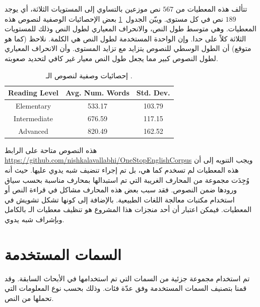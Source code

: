 تتألف هذه المعطيات من $567$ نص موزعين بالتساوي إلى المستويات الثلاثة،
أي يوجد $189$ نص في كل مستوى.
ويبّن الجدول~\ref{tbl:corpus:ose_stat} بعض الإحصائيات الوصفية لنصوص هذه المعطيات.
وهي متوسط طول النص، والانحراف المعياري لطول النص وذلك للمستويات الثلاثة كلاً على حدا.
وإن الواحدة المستخدمة لطول النص هي الكلمة.
نلاحظ (كما هو متوقع) أن الطول الوسطي للنصوص يتزايد مع تزايد المستوى.
وأن الانحراف المعياري لطول النصوص كبير مما يجعل طول النص معيار غير كافي لتحديد صعوبته.

\begin{table}[htb]
	\centering
	{
		\setlength{\tabcolsep}{0.5em} %
		\renewcommand{\arraystretch}{1.4}%
		
		\begin{tabular}{|c|c|c|}
			\hline
			
			\textbf{Reading Level} &
			\textbf{Avg. Num. Words} &
			\textbf{Std. Dev.}\\
			\hline 
			
			Elementary &
			533.17 &
			103.79 \\
			\hline
			
			Intermediate &
			676.59 &
			117.15 \\
			\hline
			
			Advanced &
			820.49 &
			162.52 \\
			\hline
			
		\end{tabular}
	}
	\caption{%
		إحصائيات وصفية لنصوص الـ .
	}
	\label{tbl:corpus:ose_stat}
\end{table}

هذه النصوص متاحة على الرابط
\url{https://github.com/nishkalavallabhi/OneStopEnglishCorpus}
ويجب التنويه إلى أن هذه المعطيات لم تسخدم كما هي، بل تم إجراء تنضيف شبه يدوي عليها.
حيث أنه وُجِدَت مجموعة من المحارف الغريبة التي تم استبدالها بمحارف مناسبة بحسب سياق ورودها ضمن النصوص.
فقد سبب بعض هذه المحارف مشاكل في قراءة النص أو استخدام مكتبات معالجة اللغات الطبيعية.
بالإضافة إلى كونها تشكل تشويش في المعطيات.
فيمكن اعتبار أن أحد منجزات هذا المشروع هو تنظيف معطيات الـ  بالكامل وبإشراف شبه يدوي.


\section{السمات المستخدمة}
\label{sec:sys:features}
تم استخدام مجموعة جزئية من السمات التي تم استخدامها في الأبحاث السابقة.
وقد قمنا بتصنيف السمات المستخدمة وفق عدّة فئات.
وذلك بحسب نوع المعلومات التي تحملها من النص.

